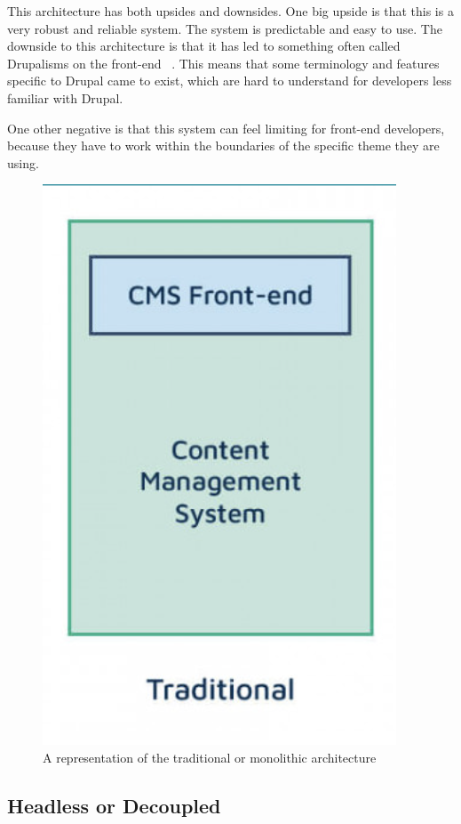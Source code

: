 This architecture has both upsides and downsides. One big upside is that this is a very robust and reliable system. The system is predictable and easy to use. The downside to this architecture is that it has led to something often called Drupalisms on the front-end ~\autocite{So2018}. This means that some terminology and features specific to Drupal came to exist, which are hard to understand for developers less familiar with Drupal. 

One other negative is that this system can feel limiting for front-end developers, because they have to work within the boundaries of the specific theme they are using.

\begin{figure}
\centering
\includegraphics{./img/Traditional_Architecture}
\caption[Traditional CMS architecture]{A representation of the traditional or monolithic architecture ~\autocite{Dropsolid2021}}
\end{figure}


\subsection{Headless or Decoupled}

